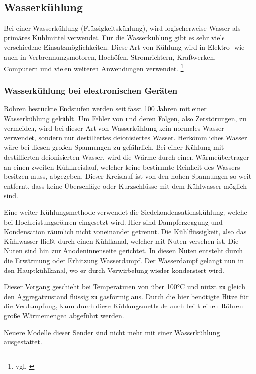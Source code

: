 \newpage

\subsection{Wasserkühlung}  \label{Stand der Technik}

Bei einer Wasserkühlung (Flüssigkeitskühlung), wird logischerweise Wasser als primäres Kühlmittel verwendet. Für die Wasserkühlung gibt es sehr viele verschiedene Einsatzmöglichkeiten. Diese Art von Kühlung wird in Elektro- wie auch in Verbrennungsmotoren, Hochöfen, Stromrichtern, Kraftwerken, Computern und vielen weiteren Anwendungen verwendet. \footnote{vgl. \cite{Wasserkuehlung}}

\subsubsection{Wasserkühlung bei elektronischen Geräten}

Röhren bestückte Endstufen werden seit fasst 100 Jahren mit einer Wasserkühlung gekühlt. Um Fehler von und deren Folgen, also Zerstörungen, zu vermeiden, wird bei dieser Art von Wasserkühlung kein normales Wasser verwendet, sondern nur destilliertes deionisiertes Wasser. Herkömmliches Wasser wäre bei diesen großen Spannungen zu gefährlich. Bei einer Kühlung mit destillierten deionisierten Wasser, wird die Wärme durch einen Wärmeübertrager an einen zweiten Kühlkreislauf, welcher keine bestimmte Reinheit des Wassers besitzen muss, abgegeben. Dieser Kreislauf ist von den hohen Spannungen so weit entfernt, dass keine Überschläge oder Kurzschlüsse mit dem Kühlwasser möglich sind. 

Eine weiter Kühlungsmethode verwendet die Siedekondensationskühlung, welche bei Hochleistungsröhren eingesetzt wird. Hier sind Dampferzeugung und Kondensation räumlich nicht voneinander getrennt. Die Kühlflüssigkeit, also das Kühlwasser fließt durch einen Kühlkanal, welcher mit Nuten versehen ist. Die Nuten sind hin zur Anodeninnenseite gerichtet.
In diesen Nuten entsteht durch die Erwärmung oder Erhitzung Wasserdampf. Der Wasserdampf gelangt nun in den Hauptkühlkanal, wo er durch Verwirbelung wieder kondensiert wird.

Dieser Vorgang geschieht bei Temperaturen von über 100°C und nützt zu gleich den Aggregatzustand flüssig zu gasförmig aus. Durch die hier benötigte Hitze für die Verdampfung, kann durch diese Kühlungsmethode auch bei kleinen Röhren große Wärmemengen abgeführt werden.

Neuere Modelle dieser Sender sind nicht mehr mit einer Wasserkühlung ausgestattet.

